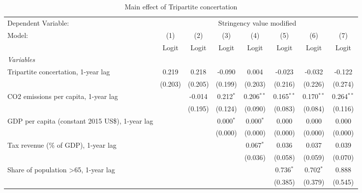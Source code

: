 
\begin{table}[htbp]
   \caption{Main effect of Tripartite concertation}
   \centering
   \begin{tabular}{lccccccc}
      \toprule
      Dependent Variable: & \multicolumn{7}{c}{Stringency value modified}\\
      Model:                                                & (1)     & (2)     & (3)         & (4)          & (5)          & (6)          & (7)\\  
                                                            &  Logit  & Logit   & Logit       & Logit        & Logit        & Logit        & Logit\\  
      \midrule
      \emph{Variables}\\
      Tripartite concertation, 1-year lag                   & 0.219   & 0.218   & -0.090      & 0.004        & -0.023       & -0.032       & -0.122\\   
                                                            & (0.203) & (0.205) & (0.199)     & (0.203)      & (0.216)      & (0.226)      & (0.274)\\   
      CO2 emissions per capita, 1-year lag                  &         & -0.014  & 0.212$^{*}$ & 0.206$^{**}$ & 0.165$^{**}$ & 0.170$^{**}$ & 0.264$^{**}$\\   
                                                            &         & (0.195) & (0.124)     & (0.090)      & (0.083)      & (0.084)      & (0.116)\\   
      GDP per capita (constant 2015 US\$), 1-year lag       &         &         & 0.000$^{*}$ & 0.000$^{*}$  & 0.000        & 0.000        & 0.000\\   
                                                            &         &         & (0.000)     & (0.000)      & (0.000)      & (0.000)      & (0.000)\\   
      Tax revenue (\% of GDP), 1-year lag                   &         &         &             & 0.067$^{*}$  & 0.036        & 0.037        & 0.039\\   
                                                            &         &         &             & (0.036)      & (0.058)      & (0.059)      & (0.070)\\   
      Share of population >65, 1-year lag                   &         &         &             &              & 0.736$^{*}$  & 0.702$^{*}$  & 0.888\\   
                                                            &         &         &             &              & (0.385)      & (0.379)      & (0.545)\\   

\end{tabular}
\end{table}
